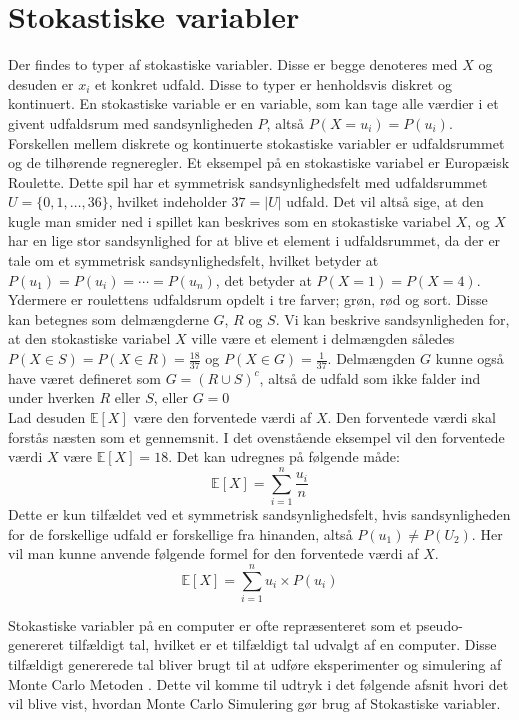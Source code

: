 \documentclass[../../SRP.tex]{subfiles}
\begin{document}
\section{Stokastiske variabler}

Der findes to typer af stokastiske variabler. Disse er begge denoteres med $X$ og desuden er $x_i$ et konkret udfald. Disse to typer er henholdsvis diskret og kontinuert. En stokastiske variable er en variable, som kan tage alle værdier i et givent udfaldsrum med sandsynligheden $P$, altså $P(X = u_i) = P(u_i)$. Forskellen mellem diskrete og kontinuerte stokastiske variabler er udfaldsrummet og de tilhørende regneregler. Et eksempel på en stokastiske variabel er Europæisk Roulette. Dette spil har et symmetrisk sandsynlighedsfelt med udfaldsrummet $U = \{ 0,1,\dotsc,36\}$, hvilket indeholder $37 = |U|$ udfald. Det vil altså sige, at den kugle man smider ned i spillet kan beskrives som en stokastiske variabel $X$, og $X$ har en lige stor sandsynlighed for at blive et element i udfaldsrummet, da der er tale om et symmetrisk sandsynlighedsfelt, hvilket betyder at $P(u_1) = P(u_i) = \dotsb = P(u_n)$, det betyder at $P(X = 1) = P(X = 4)$. Ydermere er roulettens udfaldsrum opdelt i tre farver; grøn, rød og sort. Disse kan betegnes som delmængderne $G$, $R$ og $S$. Vi kan beskrive sandsynligheden for, at den stokastiske variabel $X$ ville være et element i delmængden således $P(X \in S) = P(X \in R) = \frac{18}{37}$ og $P(X \in G) = \frac{1}{37}$. Delmængden $G$ kunne også have været defineret som $G = (R \cup S)^c$, altså de udfald som ikke falder ind under hverken $R$ eller $S$, eller $G = 0$ \cite{NM} \\

Lad desuden $\mathbb{E}[X]$ være den forventede værdi af $X$. Den forventede værdi skal forstås næsten som et gennemsnit. I det ovenstående eksempel vil den forventede værdi $X$ være $\mathbb{E}[X] = 18$. Det kan udregnes på følgende måde:
\begin{equation}
  \mathbb{E}[X] = \sum_{i = 1}^n \frac{u_i}{n}
\end{equation}
Dette er kun tilfældet ved et symmetrisk sandsynlighedsfelt, hvis sandsynligheden for de forskellige udfald er forskellige fra hinanden, altså  $P(u_1) \neq P(U_2)$. Her vil man kunne anvende følgende formel for den forventede værdi af $X$.
\begin{equation}
  \mathbb{E}[X] = \sum_{i = 1}^n u_i \times P(u_i)
\end{equation}

Stokastiske variabler på en computer er ofte repræsenteret som et pseudo-genereret tilfældigt tal, hvilket er et tilfældigt tal udvalgt af en computer. Disse tilfældigt genererede tal bliver brugt til at udføre eksperimenter og simulering af Monte Carlo Metoden \cite{SBM}. Dette vil komme til udtryk i det følgende afsnit hvori det vil blive vist, hvordan Monte Carlo Simulering gør brug af Stokastiske variabler. 
\end{document}
